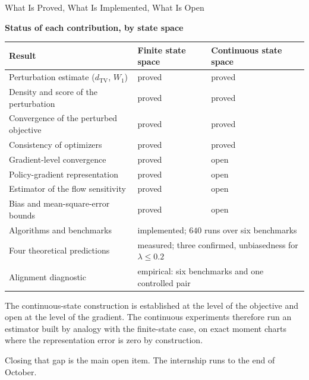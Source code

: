\documentclass[9pt]{beamer}
\newcommand{\TV}{d_{\mathrm{TV}}}
\newcommand{\good}[1]{\textcolor{Xgreen}{#1}}
\newcommand{\bad}[1]{\textcolor{Xred}{#1}}
\newcommand{\exhibittitle}[1]{%
  \begin{center}{\small\bfseries\color{Xblue}#1}\end{center}%
  \vspace{-0.28cm}}
\newenvironment{exhibit}[1]{%
  \exhibittitle{#1}%
  \par\vspace{0.05cm}\begin{center}}%
  {\end{center}\vspace{-0.15cm}}
\begin{document}
\begin{frame}{What Is Proved, What Is Implemented, What Is Open}
\scriptsize
\begin{exhibit}{Status of each contribution, by state space}
\begin{tabular}{lll}
\toprule
Result & Finite state space & Continuous state space \\
\midrule
Perturbation estimate ($\TV$, $W_1$)   & \good{proved} & \good{proved} \\
Density and score of the perturbation  & \good{proved} & \good{proved} \\
Convergence of the perturbed objective & \good{proved} & \good{proved} \\
Consistency of optimizers              & \good{proved} & \good{proved} \\
\midrule
Gradient-level convergence             & \good{proved} & \bad{open} \\
Policy-gradient representation         & \good{proved} & \bad{open} \\
Estimator of the flow sensitivity      & \good{proved} & \bad{open} \\
Bias and mean-square-error bounds      & \good{proved} & \bad{open} \\
\midrule
Algorithms and benchmarks    & \multicolumn{2}{l}{implemented; $640$ runs over six benchmarks} \\
Four theoretical predictions & \multicolumn{2}{l}{measured; three confirmed, unbiasedness for $\lambda\leq0.2$} \\
Alignment diagnostic         & \multicolumn{2}{l}{empirical: six benchmarks and one controlled pair} \\
\bottomrule
\end{tabular}
\end{exhibit}

\vspace{0.15cm}
\small
The continuous-state construction is established at the level of the objective and open at the level of the gradient. The continuous experiments therefore run an estimator built by analogy with the finite-state case, on exact moment charts where the representation error is zero by construction.

\vspace{0.1cm}
Closing that gap is the main open item. The internship runs to the end of October.
\end{frame}
\end{document}
